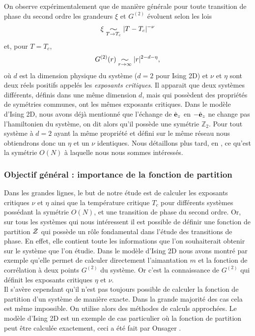 \documentclass[10.5pt]{article}
\newcommand{\widesim}[2][1.5]{
  \mathrel{\underset{#2}{\scalebox{#1}[1]{$\sim$}}}
  }
\begin{document}
\begin{multicols*}{2}
On observe expérimentalement que de manière générale pour toute transition de phase du second ordre les grandeurs $\xi$ et $G^{(2)}$ évoluent selon les lois 
\begin{equation}
	\xi \widesim{T \to T_c} |T-T_c|^{-\nu}
\end{equation}
et, pour $T = T_c$,
\begin{equation}
	 G^{(2)}(r) \widesim{r \to \infty} |r|^{2-d-\eta},
\end{equation}
où $d$ est la dimension physique du système ($d=2$ pour Ising 2D) et $\nu$ et $\eta$ sont deux réels positifs appelés les \emph{exposants critiques}.  Il apparait que deux systèmes différents, définis dans une même dimension $d$, mais qui possèdent des propriétés de symétries communes, ont les mêmes exposants critiques. Dans le modèle d'Ising 2D, nous avons déjà mentionné que l'échange de $\hat{\mathbf{e}}_z$ en $-\hat{\mathbf{e}}_z$ ne change pas l'hamiltonien du système, on dit alors qu'il possède une symétrie $\mathbb{Z}_2$. Pour tout système à $d=2$ ayant la même propriété et défini sur le même réseau nous obtiendrons donc un $\eta$ et un $\nu$ identiques. Nous détaillons plus tard, en , ce qu'est la symétrie $O(N)$  à laquelle nous nous sommes intéressés. \\


\subsubsection{Objectif général : importance de la fonction de partition}

Dans les grandes lignes, le but de notre étude est de calculer les exposants critiques $\nu$ et $\eta$ ainsi que la température critique $T_c$ pour différents systèmes possédant la symétrie $O(N)$, et une transition de phase du second ordre. Or, sur tous les systèmes qui nous intéressent il est possible de définir une fonction de partition $\mathcal{Z}$ qui possède un rôle fondamental dans l'étude des transitions de phase. En effet, elle contient toute les informations que l'on souhaiterait obtenir sur le système que l'on étudie. Dans le modèle d'Ising 2D nous avons montré par exemple qu'elle permet de calculer directement l'aimantation $m$ et la fonction de corrélation à deux points $G^{(2)}$ du système. Or c'est la connaissance de $G^{(2)}$ qui définit les exposants critiques $\eta$ et $\nu$.\\

Il s'avère cependant qu'il n'est pas toujours possible de calculer la fonction de partition d'un système de manière exacte. Dans la grande majorité des cas cela est même impossible. On utilise alors des méthodes de calculs approchées. Le modèle d'Ising 2D est un exemple de cas particulier où la fonction de partition peut être calculée exactement, ceci a été fait par Onsager \cite{Onsager}. \\


\end{multicols*}
\end{document}

